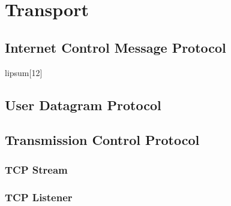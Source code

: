 \section{Transport}
\lipsum[11]
\subsection{Internet Control Message Protocol}
lipsum[12]
\subsection{User Datagram Protocol}
\lipsum[13]
\subsection{Transmission Control Protocol}
\lipsum[14]
\subsubsection{TCP Stream}
\lipsum[15]
\subsubsection{TCP Listener}
\lipsum[16]